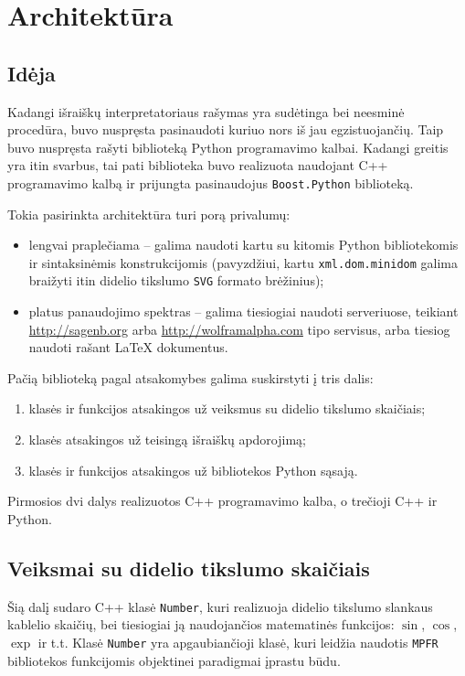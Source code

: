 \chapter{Architektūra}

\section{Idėja}

Kadangi išraiškų interpretatoriaus rašymas yra sudėtinga bei neesminė
procedūra, buvo nuspręsta pasinaudoti kuriuo nors iš jau egzistuojančių.
Taip buvo nuspręsta rašyti biblioteką Python programavimo kalbai. Kadangi
greitis yra itin svarbus, tai pati biblioteka buvo realizuota naudojant
C++ programavimo kalbą ir prijungta pasinaudojus \verb|Boost.Python| 
\cite{boost_python} biblioteką.

Tokia pasirinkta architektūra turi porą privalumų:
\begin{itemize}
  \item lengvai praplečiama – galima naudoti kartu su kitomis Python 
    bibliotekomis ir sintaksinėmis konstrukcijomis (pavyzdžiui, kartu
    \verb|xml.dom.minidom| galima braižyti itin didelio tikslumo 
    \verb|SVG| \cite{svg} formato brėžinius);
  \item platus panaudojimo spektras – galima tiesiogiai naudoti
    serveriuose, teikiant \url{http://sagenb.org} 
    arba \url{http://wolframalpha.com} tipo servisus, arba tiesiog
    naudoti rašant \LaTeX {} dokumentus.
\end{itemize}

Pačią biblioteką pagal atsakomybes galima suskirstyti į tris dalis:
\begin{enumerate}
  \item klasės ir funkcijos atsakingos už veiksmus su didelio tikslumo
    skaičiais;
  \item klasės atsakingos už teisingą išraiškų apdorojimą;
  \item klasės ir funkcijos atsakingos už bibliotekos Python sąsają.
\end{enumerate}
Pirmosios dvi dalys realizuotos C++ programavimo kalba, o trečioji
C++ ir Python.

\section{Veiksmai su didelio tikslumo skaičiais}

Šią dalį sudaro C++ klasė \verb|Number|, kuri realizuoja didelio tikslumo
slankaus kablelio skaičių, bei tiesiogiai ją naudojančios matematinės
funkcijos: $\sin$, $\cos$, $\exp$ ir t.t. Klasė \verb|Number| yra 
apgaubiančioji klasė, kuri leidžia naudotis \verb|MPFR| \cite{mpfr} 
bibliotekos funkcijomis objektinei paradigmai įprastu būdu.

